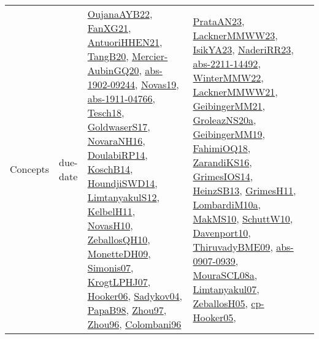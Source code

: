 {\begin{longtable}{lp{3cm}>{\raggedright}p{6cm}>{\raggedright}p{6cm}p{8cm}}
Concepts & due-date & \href{papers/OujanaAYB22.pdf}{OujanaAYB22}\cite{OujanaAYB22}, \href{articles/FanXG21.pdf}{FanXG21}\cite{FanXG21}, \href{papers/AntuoriHHEN21.pdf}{AntuoriHHEN21}\cite{AntuoriHHEN21}, \href{papers/TangB20.pdf}{TangB20}\cite{TangB20}, \href{papers/Mercier-AubinGQ20.pdf}{Mercier-AubinGQ20}\cite{Mercier-AubinGQ20}, \href{articles/abs-1902-09244.pdf}{abs-1902-09244}\cite{abs-1902-09244}, \href{articles/Novas19.pdf}{Novas19}\cite{Novas19}, \href{articles/abs-1911-04766.pdf}{abs-1911-04766}\cite{abs-1911-04766}, \href{papers/Tesch18.pdf}{Tesch18}\cite{Tesch18}, \href{papers/GoldwaserS17.pdf}{GoldwaserS17}\cite{GoldwaserS17}, \href{articles/NovaraNH16.pdf}{NovaraNH16}\cite{NovaraNH16}, \href{papers/DoulabiRP14.pdf}{DoulabiRP14}\cite{DoulabiRP14}, \href{papers/KoschB14.pdf}{KoschB14}\cite{KoschB14}, \href{papers/HoundjiSWD14.pdf}{HoundjiSWD14}\cite{HoundjiSWD14}, \href{articles/LimtanyakulS12.pdf}{LimtanyakulS12}\cite{LimtanyakulS12}, \href{articles/KelbelH11.pdf}{KelbelH11}\cite{KelbelH11}, \href{articles/NovasH10.pdf}{NovasH10}\cite{NovasH10}, \href{articles/ZeballosQH10.pdf}{ZeballosQH10}\cite{ZeballosQH10}, \href{papers/MonetteDH09.pdf}{MonetteDH09}\cite{MonetteDH09}, \href{articles/Simonis07.pdf}{Simonis07}\cite{Simonis07}, \href{papers/KrogtLPHJ07.pdf}{KrogtLPHJ07}\cite{KrogtLPHJ07}, \href{articles/Hooker06.pdf}{Hooker06}\cite{Hooker06}, \href{papers/Sadykov04.pdf}{Sadykov04}\cite{Sadykov04}, \href{articles/PapaB98.pdf}{PapaB98}\cite{PapaB98}, \href{articles/Zhou97.pdf}{Zhou97}\cite{Zhou97}, \href{papers/Zhou96.pdf}{Zhou96}\cite{Zhou96}, \href{papers/Colombani96.pdf}{Colombani96}\cite{Colombani96} & \href{articles/PrataAN23.pdf}{PrataAN23}\cite{PrataAN23}, \href{articles/LacknerMMWW23.pdf}{LacknerMMWW23}\cite{LacknerMMWW23}, \href{articles/IsikYA23.pdf}{IsikYA23}\cite{IsikYA23}, \href{articles/NaderiRR23.pdf}{NaderiRR23}\cite{NaderiRR23}, \href{articles/abs-2211-14492.pdf}{abs-2211-14492}\cite{abs-2211-14492}, \href{papers/WinterMMW22.pdf}{WinterMMW22}\cite{WinterMMW22}, \href{papers/LacknerMMWW21.pdf}{LacknerMMWW21}\cite{LacknerMMWW21}, \href{papers/GeibingerMM21.pdf}{GeibingerMM21}\cite{GeibingerMM21}, \href{papers/GroleazNS20a.pdf}{GroleazNS20a}\cite{GroleazNS20a}, \href{papers/GeibingerMM19.pdf}{GeibingerMM19}\cite{GeibingerMM19}, \href{articles/FahimiOQ18.pdf}{FahimiOQ18}\cite{FahimiOQ18}, \href{articles/ZarandiKS16.pdf}{ZarandiKS16}\cite{ZarandiKS16}, \href{articles/GrimesIOS14.pdf}{GrimesIOS14}\cite{GrimesIOS14}, \href{articles/HeinzSB13.pdf}{HeinzSB13}\cite{HeinzSB13}, \href{papers/GrimesH11.pdf}{GrimesH11}\cite{GrimesH11}, \href{articles/LombardiM10a.pdf}{LombardiM10a}\cite{LombardiM10a}, \href{papers/MakMS10.pdf}{MakMS10}\cite{MakMS10}, \href{papers/SchuttW10.pdf}{SchuttW10}\cite{SchuttW10}, \href{papers/Davenport10.pdf}{Davenport10}\cite{Davenport10}, \href{papers/ThiruvadyBME09.pdf}{ThiruvadyBME09}\cite{ThiruvadyBME09}, \href{articles/abs-0907-0939.pdf}{abs-0907-0939}\cite{abs-0907-0939}, \href{papers/MouraSCL08a.pdf}{MouraSCL08a}\cite{MouraSCL08a}, \href{papers/Limtanyakul07.pdf}{Limtanyakul07}\cite{Limtanyakul07}, \href{articles/ZeballosH05.pdf}{ZeballosH05}\cite{ZeballosH05}, \href{papers/cp-Hooker05.pdf}{cp-Hooker05}\cite{cp-Hooker05}, 
\end{longtable}}
